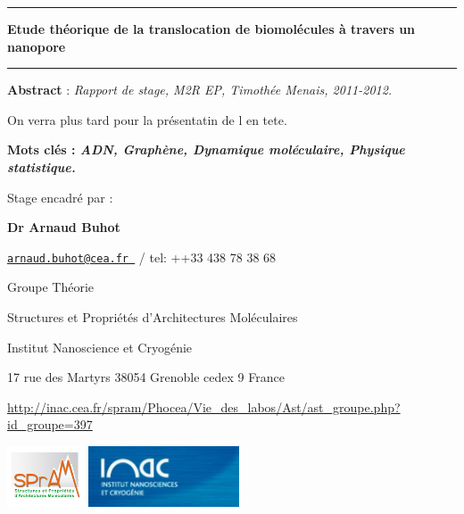 \documentclass[a4paper,11pt]{article}
\begin{document}
\begin{center}

\vspace{1.5cm}

\rule[11pt]{5cm}{0.5pt}

\textbf{\huge Etude théorique de la translocation de
biomolécules à travers un nanopore}

\rule{5cm}{0.5pt}

\vspace{1.5cm}

\parbox{15cm}{\small
\textbf{Abstract} : \it Rapport de stage, M2R EP, Timothée Menais, 2011-2012.

\vspace{0.5cm}
\rm On verra plus tard pour la présentatin de l en tete.
} %


\vspace{0.5cm}

\parbox{15cm}{
\textbf{Mots clés : \it ADN, Graphène, Dynamique moléculaire, Physique statistique.} }%

\vspace{0.5cm}

\parbox{15cm}{
Stage encadré par :

{\bf Dr Arnaud Buhot }

\href{mailto:	arnaud.buhot@cea.fr }{\tt 	arnaud.buhot@cea.fr }  / tel: ++33 438 78 38 68



Groupe Théorie

Structures et Propriétés d'Architectures Moléculaires

Institut Nanoscience et Cryogénie
{\it 

17 rue des Martyrs
38054 Grenoble cedex 9
France}

\url{http://inac.cea.fr/spram/Phocea/Vie_des_labos/Ast/ast_groupe.php?id_groupe=397}
} %

\vspace{1cm}


\includegraphics[height=1.8cm]{spram.jpg} \hspace{0.3cm}
\includegraphics[height=1.8cm]{inac.jpg}

\end{center}
\end{document}
